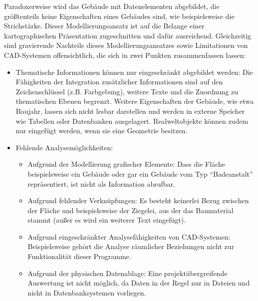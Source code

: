 Paradoxerweise wird das Gebäude mit Datenelementen abgebildet, die größtenteils keine Eigenschaften eines Gebäudes sind, wie beispielsweise die Strichstärke. Dieser Modellierungsansatz ist auf die Belange einer kartographischen Präsentation zugeschnitten und dafür ausreichend. Gleichzeitig sind gravierende Nachteile dieses Modellierungsansatzes sowie Limitationen von CAD-Systemen offensichtlich, die sich in zwei Punkten zusammenfassen lassen:
\begin{itemize}
	\item Thematische Informationen können nur eingeschränkt abgebildet werden: Die Fähigkeiten der Integration zusätzlicher Informationen sind auf den Zeichenschlüssel (z.B. Farbgebung), weitere Texte und die Zuordnung zu thematischen Ebenen begrenzt. Weitere Eigenschaften der Gebäude, wie etwa Baujahr, lassen sich nicht lesbar darstellen und werden in externe Speicher wie Tabellen oder Datenbanken ausgelagert. Realweltobjekte können zudem nur eingefügt werden, wenn sie eine Geometrie besitzen.
	\item Fehlende Analysemöglichkeiten:
	\begin{itemize}
		\item Aufgrund der Modellierung grafischer Elemente: Dass die Fläche beispielsweise ein Gebäude oder gar ein Gebäude vom Typ "`Badeanstalt"' repräsentiert, ist nicht als Information abrufbar.
		\item Aufgrund fehlender Verknüpfungen: Es besteht keinerlei Bezug zwischen der Fläche und beispielsweise der Ziegelei, aus der das Baumaterial stammt (außer es wird ein weiterer Text eingefügt).
		\item Aufgrund eingeschränkter Analysefähigkeiten von CAD-Systemen: Beispielsweise gehört die Analyse räumlicher Beziehungen nicht zur Funktionalität dieser Programme.
		\item Aufgrund der physischen Datenablage: Eine projektübergreifende Auswertung ist nicht möglich, da Daten in der Regel nur in Dateien und nicht in Datenbanksystemen vorliegen.
	\end{itemize}
\end{itemize}

